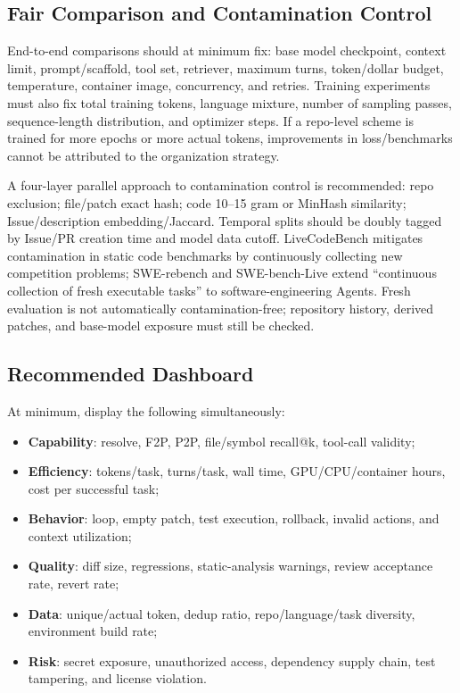 \documentclass[10pt,a4paper,UTF8,fontset=none]{ctexart}
\begin{document}
\subsection{Fair Comparison and Contamination Control}

End-to-end comparisons should at minimum fix: base model checkpoint, context limit, prompt/scaffold, tool set, retriever, maximum turns, token/dollar budget, temperature, container image, concurrency, and retries. Training experiments must also fix total training tokens, language mixture, number of sampling passes, sequence-length distribution, and optimizer steps. If a repo-level scheme is trained for more epochs or more actual tokens, improvements in loss/benchmarks cannot be attributed to the organization strategy.

A four-layer parallel approach to contamination control is recommended: repo exclusion; file/patch exact hash; code 10--15 gram or MinHash similarity; Issue/description embedding/Jaccard. Temporal splits should be doubly tagged by Issue/PR creation time and model data cutoff. LiveCodeBench mitigates contamination in static code benchmarks by continuously collecting new competition problems\cite{en:jain2024livecodebench}; SWE-rebench and SWE-bench-Live extend ``continuous collection of fresh executable tasks'' to software-engineering Agents\cite{en:badertdinov2025swerebench,en:microsoft2026swebenchlive}. Fresh evaluation is not automatically contamination-free; repository history, derived patches, and base-model exposure must still be checked.

\subsection{Recommended Dashboard}

At minimum, display the following simultaneously:

\begin{itemize}
  \item \textbf{Capability}: resolve, F2P, P2P, file/symbol recall@k, tool-call validity;
  \item \textbf{Efficiency}: tokens/task, turns/task, wall time, GPU/CPU/container hours, cost per successful task;
  \item \textbf{Behavior}: loop, empty patch, test execution, rollback, invalid actions, and context utilization;
  \item \textbf{Quality}: diff size, regressions, static-analysis warnings, review acceptance rate, revert rate;
  \item \textbf{Data}: unique/actual token, dedup ratio, repo/language/task diversity, environment build rate;
  \item \textbf{Risk}: secret exposure, unauthorized access, dependency supply chain, test tampering, and license violation.
\end{itemize}
\end{document}
